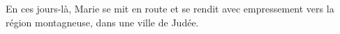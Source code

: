 En ces jours-là, Marie se mit en route et se rendit avec empressement vers la région montagneuse, dans une ville de Judée.